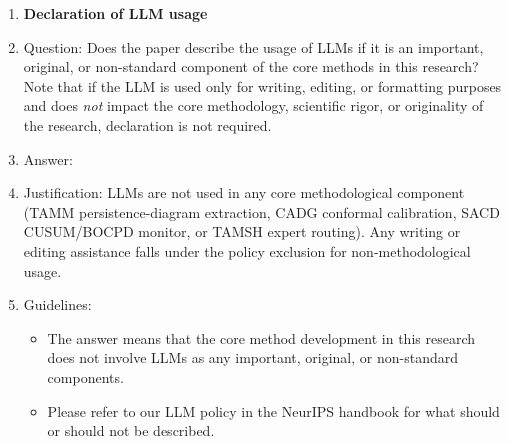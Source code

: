 \begin{enumerate}
\item {\bf Declaration of LLM usage}
    \item[] Question: Does the paper describe the usage of LLMs if it is an important, original, or non-standard component of the core methods in this research? Note that if the LLM is used only for writing, editing, or formatting purposes and does \emph{not} impact the core methodology, scientific rigor, or originality of the research, declaration is not required.
    \item[] Answer: \answerNA{}
    \item[] Justification: LLMs are not used in any core methodological component (TAMM persistence-diagram extraction, CADG conformal calibration, SACD CUSUM/BOCPD monitor, or TAMSH expert routing). Any writing or editing assistance falls under the policy exclusion for non-methodological usage.
    \item[] Guidelines:
    \begin{itemize}
        \item The answer \answerNA{} means that the core method development in this research does not involve LLMs as any important, original, or non-standard components.
        \item Please refer to our LLM policy in the NeurIPS handbook for what should or should not be described.
    \end{itemize}

\end{enumerate}
